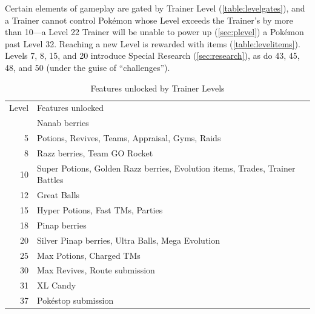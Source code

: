 Certain elements of gameplay are gated by Trainer Level (\autoref{table:levelgates}),
  and a Trainer cannot control Pokémon whose Level exceeds the Trainer's
  by more than 10---a Level 22 Trainer will be unable to power up (\autoref{sec:plevel}) a Pokémon past Level 32.
Reaching a new Level is rewarded with items (\autoref{table:levelitems}).
Levels 7, 8, 15, and 20 introduce Special Research (\autoref{sec:research}), as do
 43, 45, 48, and 50 (under the guise of ``challenges'').
\begin{table}
  \centering
  \begin{tabular}{r p{}}
  Level & Features unlocked \\
\Midrule
  2 & Nanab berries \\
  5 & Potions, Revives, Teams, Appraisal, Gyms, Raids \\
  8 & Razz berries, Team GO Rocket \\
  10 & Super Potions, Golden Razz berries, Evolution items, Trades, Trainer Battles \\
  12 & Great Balls \\
  15 & Hyper Potions, Fast TMs, Parties \\
  18 & Pinap berries \\
  20 & Silver Pinap berries, Ultra Balls, Mega Evolution \\
  25 & Max Potions, Charged TMs \\
  30 & Max Revives, Route submission \\
  31 & XL Candy \\
  37 & Pokéstop submission \\
\end{tabular}
  \caption{Features unlocked by Trainer Levels\label{table:levelgates}}
\end{table}
